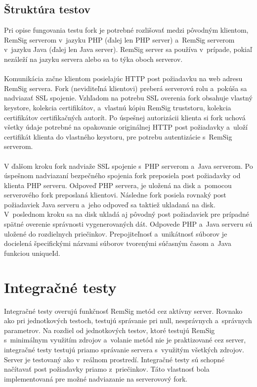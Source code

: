 \documentclass[
  digital, %
  table,   %
oneside,
  nolof,     %
  nolot,     %
]{fithesis3}
\begin{document}
\subsection{Štruktúra testov}
Pri opise fungovania testu fork je potrebné rozlišovať medzi pôvodným klientom, RemSig serverom v~jazyku PHP (ďalej len PHP server) a~RemSig serverom v~jazyku Java (ďalej len Java server). RemSig server sa používa v~prípade, pokiaľ nezáleží na jazyku servera alebo sa to týka oboch serverov. \paragraph{} 
Komunikácia začne klientom posielajúc HTTP post požiadavku na web adresu RemSig servera. Fork (neviditeľná klientovi) preberá serverovú rolu a~pokúša sa nadviazať SSL spojenie. Vzhľadom na potrebu SSL overenia fork  obsahuje vlastný keystore, kolekcia certifikátov, a~vlastnú kópiu RemSig truststoru, kolekcia certifikátov certifikačných autorít. Po úspešnej autorizácii klienta si fork uchová všetky údaje potrebné na opakovanie originálnej HTTP post požiadavky a~uloží certifikát klienta do vlastného keystoru, pre potrebu autentizácie s~RemSig serverom. \paragraph{}
V ďalšom kroku fork nadviaže SSL spojenie s~PHP serverom a~Java serverom. Po úspešnom nadviazaní bezpečného spojenia fork preposiela post požiadavky od klienta PHP serveru. Odpoveď PHP servera, je uložená na disk a~pomocou serverového fork preposlaná klientovi. Následne fork posiela rovnaký post požiadaviek Java serveru a~jeho odpoveď sa taktiež ukladaná na disk. V~poslednom kroku sa na disk ukladá aj pôvodný post požiadaviek pre prípadné spätné overenie správnosti vygenerovaných dát. Odpovede PHP a~Java serveru sú uložené do rozdielnych priečinkov. Prepojiteľnosť a~unikátnosť  súborov je docielená špecifickými názvami súborov tvorenými súčasným časom a~Java funkciou  uniqueId. 



\section{Integračné testy}
Integračné testy  overujú funkčnosť RemSig metód cez aktívny server. Rovnako ako pri jednotkových testoch, testujú správanie pri null, nesprávnych a~správnych parametrov. Na rozdiel od jednotkových testov, ktoré testujú RemSig s~minimálnym využitím zdrojov a~volanie metód nie je praktizované cez server, integračné testy testujú priamo správanie servera s~využitým všetkých zdrojov. Server je testovaný ako v~reálnom prostredí. Integračné testy sú schopné načítavať post požiadavky priamo z~priečinkov. Táto  vlastnosť bola implementovaná pre možné nadviazanie na  serverovový  fork.
\end{document}
